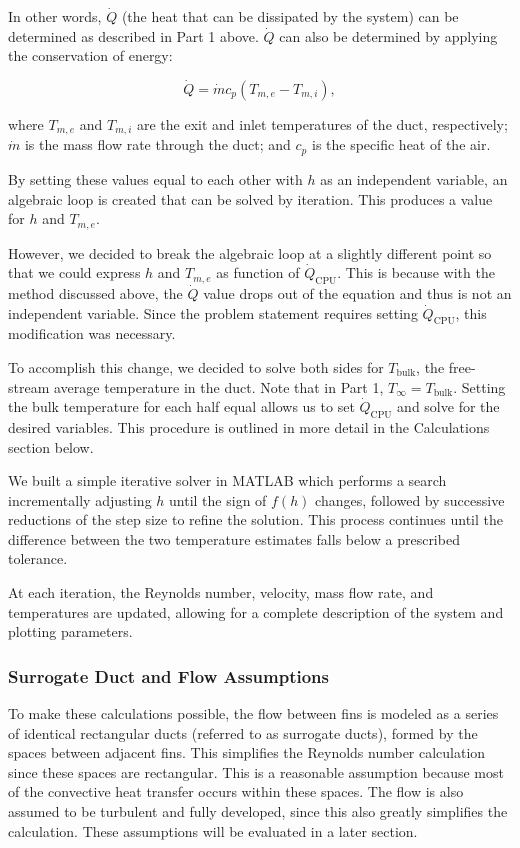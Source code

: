 \documentclass[12pt, titlepage]{article}
\begin{document}
In other words, $\dot{Q}$ (the heat that can be dissipated by the system) can be determined as described in Part 1 above. $\dot{Q}$ can also be determined by applying the conservation of energy:

\begin{equation}
\dot{Q} = \dot{m}c_p(T_{m,e}-T_{m,i}),
\end{equation} 

where $T_{m,e}$ and $T_{m,i}$ are the exit and inlet temperatures of the duct, respectively; $\dot{m}$ is the mass flow rate through the duct; and $c_p$ is the specific heat of the air.

By setting these values equal to each other with $h$ as an independent variable, an algebraic loop is created that can be solved by iteration. This produces a value for $h$ and $T_{m,e}$.

However, we decided to break the algebraic loop at a slightly different point so that we could express $h$ and $T_{m,e}$ as function of $\dot{Q}_{\text{CPU}}$. This is because with the method discussed above, the $\dot{Q}$ value drops out of the equation and thus is not an independent variable. Since the problem statement requires setting $\dot{Q}_{\text{CPU}}$, this modification was necessary.

To accomplish this change, we decided to solve both sides for $T_{\text{bulk}}$, the free-stream average temperature in the duct. Note that in Part 1, $T_{\infty} = T_{\text{bulk}}$. Setting the bulk temperature for each half equal allows us to set $\dot{Q}_{\text{CPU}}$ and solve for the desired variables. This procedure is outlined in more detail in the Calculations section below.

We built a simple iterative solver in MATLAB which performs a search incrementally adjusting $h$ until the sign of $f(h)$ changes, followed by successive reductions of the step size to refine the solution. This process continues until the difference between the two temperature estimates falls below a prescribed tolerance.

At each iteration, the Reynolds number, velocity, mass flow rate, and temperatures are updated, allowing for a complete description of the system and plotting parameters.

\subsubsection{Surrogate Duct and Flow Assumptions}

To make these calculations possible, the flow between fins is modeled as a series of identical rectangular ducts (referred to as surrogate ducts), formed by the spaces between adjacent fins. This simplifies the Reynolds number calculation since these spaces are rectangular. This is a reasonable assumption because most of the convective heat transfer occurs within these spaces. The flow is also assumed to be turbulent and fully developed, since this also greatly simplifies the calculation. These assumptions will be evaluated in a later section.
\end{document}
